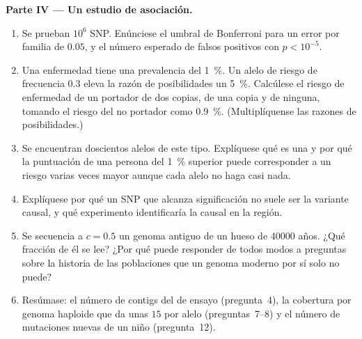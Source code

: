 \begin{problem}
\medskip
\noindent\textbf{Parte IV --- Un estudio de asociación.}
\begin{enumerate}[resume]
  \item Se prueban $10^{6}$ SNP. Enúnciese el umbral de Bonferroni para
        un error por familia de $0.05$, y el número esperado de falsos
        positivos con $p < 10^{-5}$.
  \item Una enfermedad tiene una prevalencia del \qty{1}{\%}. Un alelo
        de riesgo de frecuencia $0.3$ eleva la razón de posibilidades un
        \qty{5}{\%}. Calcúlese el riesgo de enfermedad de un portador de
        dos copias, de una copia y de ninguna, tomando el riesgo del no
        portador como \qty{0.9}{\%}. (Multiplíquense las razones de
        posibilidades.)
  \item Se encuentran doscientos alelos de este tipo. Explíquese qué es
        una  y por qué la puntuación de una persona
        del \qty{1}{\%} superior puede corresponder a un riesgo varias
        veces mayor aunque cada alelo no haga casi nada.
  \item Explíquese por qué un SNP que alcanza significación no suele ser
        la variante causal, y qué experimento identificaría la causal en
        la región.
  \item Se secuencia a $c = 0.5$ un genoma antiguo de un hueso de
        \num{40000} años. ¿Qué fracción de él se lee? ¿Por qué puede
        responder de todos modos a preguntas sobre la historia de las
        poblaciones que un genoma moderno por sí solo no puede?
  \item Resúmase: el número de contigs del  de ensayo
        (pregunta~4), la cobertura por genoma haploide que da unas $15$
         por alelo (preguntas~7--8) y el número de mutaciones
        nuevas de un niño (pregunta~12).
\end{enumerate}
\end{problem}
